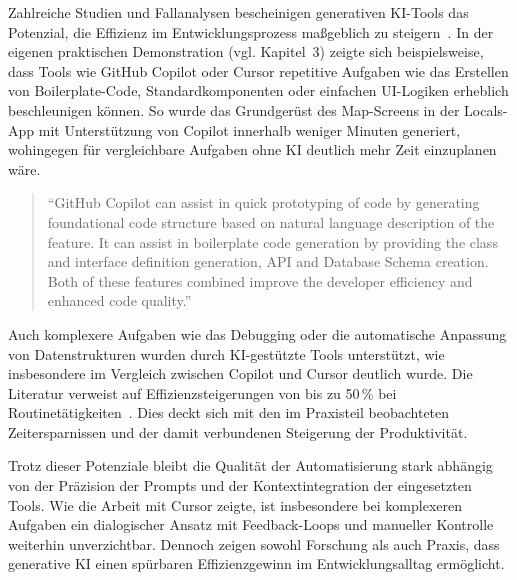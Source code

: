 Zahlreiche Studien und Fallanalysen bescheinigen generativen KI-Tools das
Potenzial, die Effizienz im Entwicklungsprozess maßgeblich zu
steigern~\cite{10741797,coutinho2024rolegenerativeaisoftware,deloitte2024,computerwoche2023,fraunhofer2024}.
In der eigenen praktischen Demonstration (vgl. Kapitel~3) zeigte sich
beispielsweise, dass Tools wie GitHub Copilot oder Cursor repetitive Aufgaben
wie das Erstellen von Boilerplate-Code, Standardkomponenten oder einfachen
UI-Logiken erheblich beschleunigen können. So wurde das Grundgerüst des
Map-Screens in der Locals-App mit Unterstützung von Copilot innerhalb weniger
Minuten generiert, wohingegen für vergleichbare Aufgaben ohne KI deutlich mehr
Zeit einzuplanen wäre.

\begin{quote}
    \enquote{GitHub Copilot can assist in quick prototyping of code by generating foundational code structure based on natural language description of the feature. It can assist in boilerplate code generation by providing the class and interface definition generation, API and Database Schema creation. Both of these features combined improve the developer efficiency and enhanced code quality.}
    \cite[S.~8]{10741797}
\end{quote}

Auch komplexere Aufgaben wie das Debugging oder die automatische Anpassung von
Datenstrukturen wurden durch KI-gestützte Tools unterstützt, wie insbesondere
im Vergleich zwischen Copilot und Cursor deutlich wurde. Die Literatur verweist
auf Effizienzsteigerungen von bis zu 50\,\% bei
Routinetätigkeiten~\cite{deloitte2024}. Dies deckt sich mit den im Praxisteil
beobachteten Zeitersparnissen und der damit verbundenen Steigerung der
Produktivität.

Trotz dieser Potenziale bleibt die Qualität der Automatisierung stark abhängig
von der Präzision der Prompts und der Kontextintegration der eingesetzten
Tools. Wie die Arbeit mit Cursor zeigte, ist insbesondere bei komplexeren
Aufgaben ein dialogischer Ansatz mit Feedback-Loops und manueller Kontrolle
weiterhin unverzichtbar. Dennoch zeigen sowohl Forschung als auch Praxis, dass
generative KI einen spürbaren Effizienzgewinn im Entwicklungsalltag ermöglicht.


